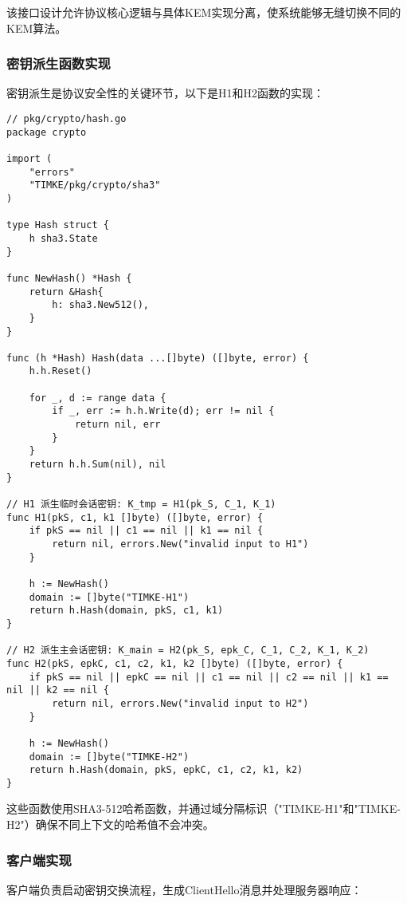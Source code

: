 该接口设计允许协议核心逻辑与具体KEM实现分离，使系统能够无缝切换不同的KEM算法。

\subsubsection{密钥派生函数实现}

密钥派生是协议安全性的关键环节，以下是H1和H2函数的实现：

\begin{verbatim}
// pkg/crypto/hash.go
package crypto

import (
    "errors"
    "TIMKE/pkg/crypto/sha3"
)

type Hash struct {
    h sha3.State
}

func NewHash() *Hash {
    return &Hash{
        h: sha3.New512(),
    }
}

func (h *Hash) Hash(data ...[]byte) ([]byte, error) {
    h.h.Reset()

    for _, d := range data {
        if _, err := h.h.Write(d); err != nil {
            return nil, err
        }
    }
    return h.h.Sum(nil), nil
}

// H1 派生临时会话密钥: K_tmp = H1(pk_S, C_1, K_1)
func H1(pkS, c1, k1 []byte) ([]byte, error) {
    if pkS == nil || c1 == nil || k1 == nil {
        return nil, errors.New("invalid input to H1")
    }

    h := NewHash()
    domain := []byte("TIMKE-H1")
    return h.Hash(domain, pkS, c1, k1)
}

// H2 派生主会话密钥: K_main = H2(pk_S, epk_C, C_1, C_2, K_1, K_2)
func H2(pkS, epkC, c1, c2, k1, k2 []byte) ([]byte, error) {
    if pkS == nil || epkC == nil || c1 == nil || c2 == nil || k1 == nil || k2 == nil {
        return nil, errors.New("invalid input to H2")
    }

    h := NewHash()
    domain := []byte("TIMKE-H2")
    return h.Hash(domain, pkS, epkC, c1, c2, k1, k2)
}
\end{verbatim}

这些函数使用SHA3-512哈希函数，并通过域分隔标识（"TIMKE-H1"和"TIMKE-H2"）确保不同上下文的哈希值不会冲突。

\subsubsection{客户端实现}

客户端负责启动密钥交换流程，生成ClientHello消息并处理服务器响应：

